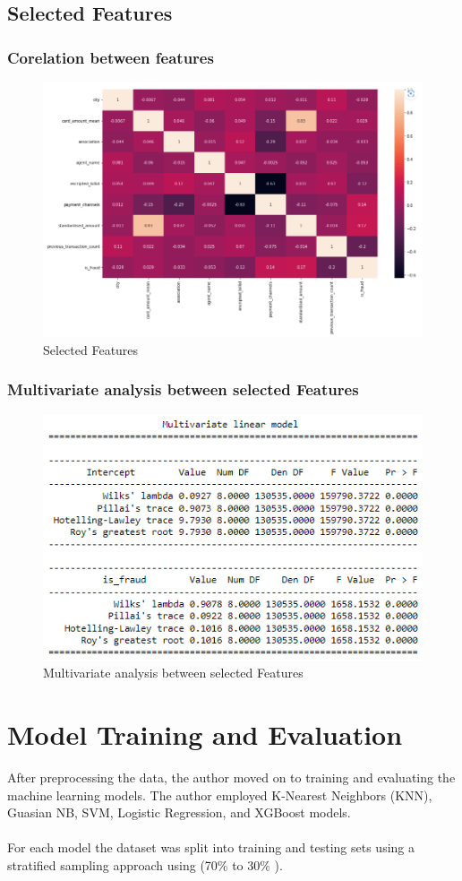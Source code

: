 \subsection{Selected Features}
\subsubsection{Corelation between features}
\newpage
\begin{figure}[h]
    \centering
    \includegraphics[width=0.9\linewidth]{image13}
    \caption{Selected Features}
    \label{fig:Selected Features}
\end{figure}
\subsubsection{Multivariate analysis between selected Features}
\vspace{1cm}
\begin{figure}[h]
    \centering
    \includegraphics[width=0.7\linewidth]{image14}
    \caption{Multivariate analysis between selected Features}
    \label{fig:Multivariate analysis between selected Features}
\end{figure}
\newpage
\section{Model Training and Evaluation}
After preprocessing the data, the author moved on to training and evaluating the machine learning models.
The author employed K-Nearest Neighbors (KNN), Guasian NB, SVM, Logistic 
Regression, and XGBoost models.\\\\
For each model the dataset was split into training and testing sets using a stratified sampling approach using (70\% to 30\% ).

